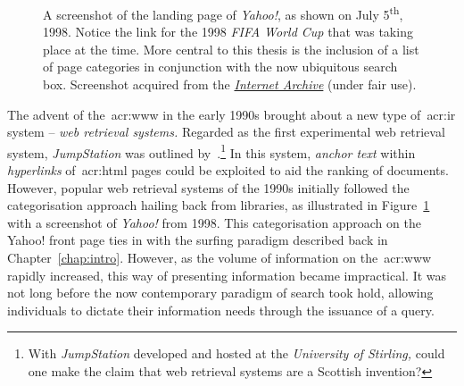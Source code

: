 \begin{figure}[t!]
    \centering
    \caption[Screenshot of \emph{Yahoo!} Search, July 1998]{A screenshot of the landing page of \emph{Yahoo!}, as shown on July 5\textsuperscript{th}, 1998. Notice the link for the 1998 \emph{FIFA World Cup} that was taking place at the time. More central to this thesis is the inclusion of a list of page categories in conjunction with the now ubiquitous search box. Screenshot acquired from the \href{https://web.archive.org/web/19980705003104/http://www.yahoo.com}{\emph{Internet Archive}} (under fair use).}
    \label{fig:yahoo}
\end{figure}

The advent of the~\gls{acr:www} in the early 1990s brought about a new type of~\gls{acr:ir} system -- \emph{web retrieval systems.} Regarded as the first experimental web retrieval system, \emph{JumpStation} was outlined by~\cite{mcbryan1994taming_tools}.\footnote{With \emph{JumpStation} developed and hosted at the \emph{University of Stirling,} could one make the claim that web retrieval systems are a Scottish invention?} In this system, \emph{anchor text} within \emph{hyperlinks} of~\gls{acr:html} pages could be exploited to aid the ranking of documents. However, popular web retrieval systems of the 1990s initially followed the categorisation approach hailing back from libraries, as illustrated in Figure~\ref{fig:yahoo} with a screenshot of \emph{Yahoo!} from 1998. This categorisation approach on the Yahoo! front page ties in with the surfing paradigm described back in Chapter~\ref{chap:intro}. However, as the volume of information on the~\gls{acr:www} rapidly increased, this way of presenting information became impractical. It was not long before the now contemporary paradigm of search took hold, allowing individuals to dictate their information needs through the issuance of a query.

